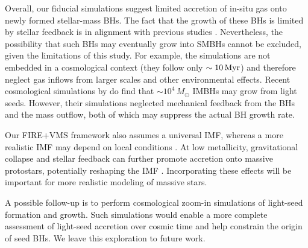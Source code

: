 \documentclass[twocolumn]{aastex631}
\begin{document}
{Overall, our fiducial simulations suggest limited accretion of in-situ gas onto newly formed stellar-mass BHs. The fact that the growth of these BHs is limited by stellar feedback is in alignment with previous studies \citep[e.g.,][]{DuboisVolonteriSilk_2015MNRAS.452.1502D,HabouzitVolonteriDubois_2017MNRAS.468.3935H,MehtaReganProle_2024OJAp....7E.107M,ShinSmithSijacki_2026MNRAS.548ag580S}.} Nevertheless, the possibility that such BHs may eventually grow into SMBHs cannot be excluded, given the limitations of this study. For example, the simulations are not embedded in a cosmological context (they follow only $\sim 10\,\rm Myr$) and therefore neglect gas inflows from larger scales and other environmental effects. {Recent cosmological simulations by \citet{MehtaReganProle_2026NatAs.tmp...21M} do find that $\sim 10^4\,M_\odot$ IMBHs may grow from light seeds. However, their simulations neglected mechanical feedback from the BHs and the mass outflow, both of which may suppress the actual BH growth rate.
}

Our FIRE+VMS framework also assumes a universal IMF, whereas a more realistic IMF may depend on local conditions \citep{GuszejnovHopkinsMa_2017MNRAS.472.2107G}. At low metallicity, gravitational collapse and stellar feedback can further promote accretion onto massive protostars, potentially reshaping the IMF \citep{BegelmanVolonteriRees_2006MNRAS.370..289B,ChonOmukai_2020MNRAS.494.2851C,ChonOmukai_2025MNRAS.539.2561C}. Incorporating these effects will be important for more realistic modeling of massive stars.

A possible follow-up is to perform cosmological zoom-in simulations of light-seed formation and growth. Such simulations would enable a more complete assessment of light-seed accretion over cosmic time and help constrain the origin of seed BHs. We leave this exploration to future work.
\end{document}

